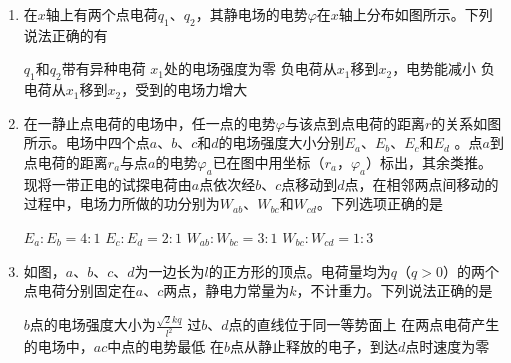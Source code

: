 \begin{enumerate} [leftmargin=0em]
\item
{}
在$ x $轴上有两个点电荷$ q_{1} $、$ q_{2} $，其静电场的电势$ \varphi $在$ x $轴上分布如图所示。下列说法正确的有  
\begin{figure}[h!]
\centering

\end{figure}


\fourchoices
{$ q_{1} $和$ q_{2} $带有异种电荷}
{$ x_{1} $处的电场强度为零}
{负电荷从$ x_{1} $移到$ x_{2} $，电势能减小}
{负电荷从$ x_{1} $移到$ x_{2} $，受到的电场力增大}





\item
{}
在一静止点电荷的电场中，任一点的电势$ \varphi $与该点到点电荷的距离$ r $的关系如图所示。电场中四个点$ a $、$ b $、$ c $和$ d $的电场强度大小分别$ E_a $、$ E_b $、$ E_c $和$ E_d $ 。点$ a $到点电荷的距离$ r_a $与点$ a $的电势$ \varphi _a $已在图中用坐标（$ r_a $，$ \varphi _a $）标出，其余类推。现将一带正电的试探电荷由$ a $点依次经$ b $、$ c $点移动到$ d $点，在相邻两点间移动的过程中，电场力所做的功分别为$ W_{ab} $、$ W_{bc} $和$ W_{cd} $。下列选项正确的是  
\begin{figure}[h!]
\centering

\end{figure}
\fourchoices
{$E _ { a }: E _ { b } = 4: 1$}
{$E _ { c }: E _ { d } = 2: 1$}
{$W _ { a b }: W _ { b c } = 3: 1$}
{$W _ { b c }: W _ { c d } = 1: 3$}





\item
{}
如图，$ a $、$ b $、$ c $、$ d $为一边长为$ l $的正方形的顶点。电荷量均为$ q $（$ q>0 $）的两个点电荷分别固定在$ a $、$ c $两点，静电力常量为$ k $，不计重力。下列说法正确的是  


\begin{minipage}[h!]{0.7\linewidth}
\vspace{0.3em}
\fourchoices
{$ b $点的电场强度大小为$\frac { \sqrt { 2 } k q } { l ^ { 2 } }$}
{过$ b $、$ d $点的直线位于同一等势面上}
{在两点电荷产生的电场中，$ ac $中点的电势最低}
{在$ b $点从静止释放的电子，到达$ d $点时速度为零}

\vspace{0.3em}
\end{minipage}
\hfill
\begin{minipage}[h!]{0.3\linewidth}
\flushright
\vspace{0.3em}

\vspace{0.3em}
\end{minipage}




\end{enumerate}
